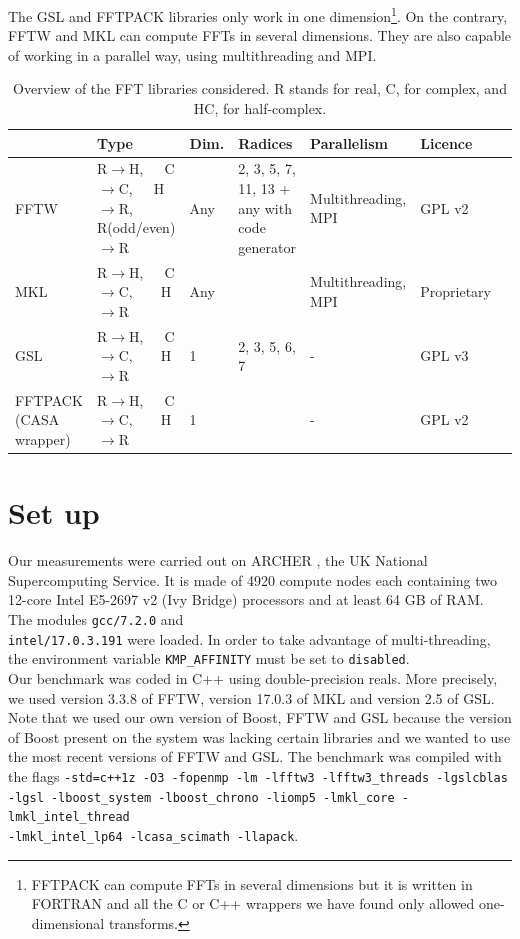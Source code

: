 \documentclass[12pt, a4paper]{article}
\begin{document}
The GSL and FFTPACK libraries only work in one dimension\footnote{FFTPACK can compute FFTs in several dimensions but it is written in FORTRAN and all the C or C++ wrappers we have found only allowed one-dimensional transforms.}. On the contrary, FFTW and MKL can compute FFTs in several dimensions. They are also capable of working in a parallel way, using multithreading and MPI.  
\begin{table}[H]
\captionsetup{width=1\textwidth}
\begin{tabular}{|p{2.5cm}||p{2.5cm}|p{1cm}|p{3cm}|p{3cm}|p{2cm}|p{2cm}|}
\hline
& Type & Dim. & Radices & Parallelism & Licence \\
\hline
\hline
FFTW & R$\to$H,\ \ \  C$\to$C,\ \ \  H$\to$R, R{\scriptsize (odd/even)}$\to$R& Any&2, 3, 5, 7, 11, 13 + any with code generator & Multithreading, MPI & GPL v2\\
\hline
MKL  &  R$\to$H,\ \ \  C$\to$C,\ \ \ \  H$\to$R& Any & & Multithreading, MPI & Proprietary\\
\hline
GSL  &  R$\to$H,\ \ \  C$\to$C,\ \ \ \  H$\to$R & 1 & 2, 3, 5, 6, 7 & - & GPL v3\\
\hline
FFTPACK {\scriptsize (CASA wrapper)} &  R$\to$H,\ \ \  C$\to$C,\ \ \ \  H$\to$R & 1 & & - & GPL v2\\
\hline
\end{tabular}
\caption{Overview of the FFT libraries considered. R stands for real, C, for complex, and HC, for half-complex.}
\label{ffttable}
\end{table}

\section{Set up}
Our measurements were carried out on ARCHER \cite{archer}, the UK National Supercomputing Service. It is made of 4920 compute nodes each containing  two 12-core Intel E5-2697 v2 (Ivy Bridge) processors and at least 64 GB of RAM. The modules \texttt{gcc/7.2.0} and \\ \texttt{intel/17.0.3.191} were loaded. In order to take advantage of multi-threading, the environment variable \texttt{KMP\_AFFINITY} must be set to \texttt{disabled}.\\

Our benchmark was coded in C++ using double-precision reals. More precisely, we used version 3.3.8 of FFTW, version 17.0.3 of MKL and version 2.5 of GSL. Note that we used our own version of Boost, FFTW and GSL because the version of Boost present on the system was lacking certain libraries and we wanted to use the most recent versions of FFTW and GSL. The benchmark was compiled with the flags \texttt{-std=c++1z -O3  -fopenmp   -lm -lfftw3 -lfftw3\_threads -lgslcblas -lgsl -lboost\_system -lboost\_chrono -liomp5 -lmkl\_core -lmkl\_intel\_thread \\-lmkl\_intel\_lp64  -lcasa\_scimath  -llapack}.\\
\end{document}
